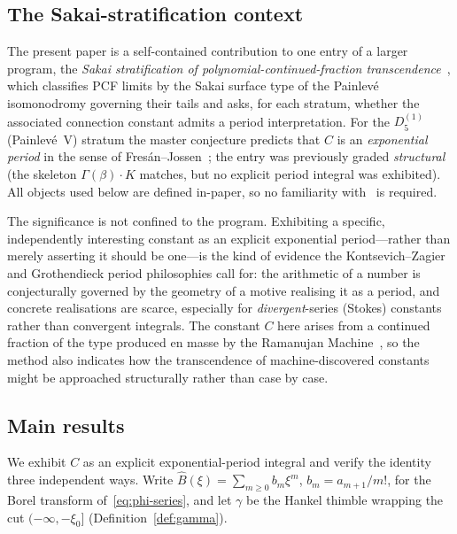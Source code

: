 \documentclass[11pt,reqno]{amsart}
\renewcommand{\_}{\vquadorigunderscore\allowbreak}
\theoremstyle{plain}
\theoremstyle{definition}
\newcommand{\Bhat}{\widehat{B}}
\newcommand{\xizero}{\xi_0}
\providecommand{\C}{}\renewcommand{\C}{C}
\begin{document}
\subsection{The Sakai-stratification context}
The present paper is a self-contained contribution to one entry of a larger program, the
\emph{Sakai stratification of polynomial-continued-fraction transcendence}~\cite{Sakai}, which
classifies PCF limits by the Sakai surface type of the Painlev\'e isomonodromy governing their
tails and asks, for each stratum, whether the associated connection constant admits a period
interpretation. For the $D_5^{(1)}$ (Painlev\'e~V) stratum the master conjecture predicts that
$\C$ is an \emph{exponential period} in the sense of Fres\'an--Jossen~\cite{FJ}; the entry was
previously graded \emph{structural} (the skeleton $\Gamma(\beta)\cdot K$ matches, but no explicit
period integral was exhibited). All objects used below are defined in-paper, so no familiarity
with~\cite{Sakai} is required.

The significance is not confined to the program. Exhibiting a specific, independently interesting
constant as an explicit exponential period---rather than merely asserting it should be one---is the
kind of evidence the Kontsevich--Zagier and Grothendieck period philosophies call for: the
arithmetic of a number is conjecturally governed by the geometry of a motive realising it as a
period, and concrete realisations are scarce, especially for \emph{divergent}-series (Stokes)
constants rather than convergent integrals. The constant $\C$ here arises from a continued fraction
of the type produced en masse by the Ramanujan Machine~\cite{RamanujanMachine}, so the method also
indicates how the transcendence of machine-discovered constants might be approached structurally
rather than case by case.

\subsection{Main results}
We exhibit $\C$ as an explicit exponential-period integral and verify the identity three
independent ways. Write $\Bhat(\xi)=\sum_{m\ge0}b_m\xi^m$, $b_m=a_{m+1}/m!$, for the Borel
transform of~\eqref{eq:phi-series}, and let $\gamma$ be the Hankel thimble wrapping the cut
$(-\infty,-\xizero]$ (Definition~\ref{def:gamma}).
\end{document}

